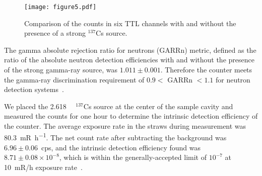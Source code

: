 \documentclass[preprint,final]{elsarticle}
\begin{document}
\begin{figure}[!htbp]
    \centering
     \texttt{[image: figure5.pdf]}
    \caption{Comparison of the counts in six TTL channels with and without the presence of a strong ${}^{137}$Cs source. }
    \label{fig:Cf-CfandCs_TTL}
\end{figure}
{The gamma absolute rejection ratio for neutrons (GARRn) metric, defined as the ratio of the absolute neutron detection efficiencies with and without the presence of the strong gamma-ray source, was $1.011\pm0.001$. Therefore the counter meets the gamma-ray discrimination requirement of $0.9<$ GARRn $<1.1$ for neutron detection systems~\cite{kouzes2011neutron}.}

{We placed the \SI{2.618}{\milli\Ci} ${}^{137}$Cs source at the center of the sample cavity and measured the counts for one hour to determine the intrinsic  detection efficiency of the counter.  The average exposure rate in the straws during measurement was \SI{80.3}{\milli R\per \hour}. The net  count rate after subtracting the background was $6.96\pm0.06$~cps, and the intrinsic  detection efficiency found was $8.71\pm0.08 \times 10^{-8}$, which is within the generally-accepted limit of $10^{-7}$ at 10~mR/h exposure rate~\cite{kouzes2011neutron}}.

\end{document}
